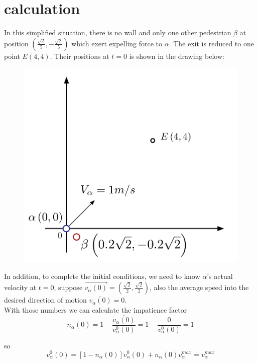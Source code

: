 \section{calculation}
In this simplified situation, there is no wall and only one other pedestrian $\beta$ at position $(\frac{\sqrt{2}}{5}, -\frac{\sqrt{2}}{5})$ which exert expelling force to $\alpha$.  The exit is reduced to one point $E(4,4)$.  Their positions at $t=0$ is shown in the drawing below:\\

\begin{figure}
\centering
{\includegraphics[scale=0.45]{Figures/calculation.pdf}} 
\caption{\small{}\label{calc}}
\end{figure}

In addition, to complete the initial conditions, we need to know $\alpha$'s actual velocity at $t=0$, suppose $\overrightarrow{v_{\alpha}(0)}=(\frac{\sqrt{2}}{2}, \frac{\sqrt{2}}{2})$, also the average speed into the desired direction of motion $\overline{v_{\alpha}(0)}=0$.\\

With those numbers we can calculate the impatience factor 
 \begin{equation}
 n_{\alpha}(0)=1-\frac{\overline{v_{\alpha}(0)}}{v^{0}_{\alpha}(0)}=1-\dfrac{0}{v^{0}_{\alpha}(0)}=1
 \end{equation}

so 
 \begin{equation}
 v^{0}_{\alpha}(0)=[1-n_{\alpha}(0)]v^{0}_{\alpha}(0) + n_{\alpha}(0)v_{\alpha}^{max} = v_{\alpha}^{max}
 \end{equation}
 
